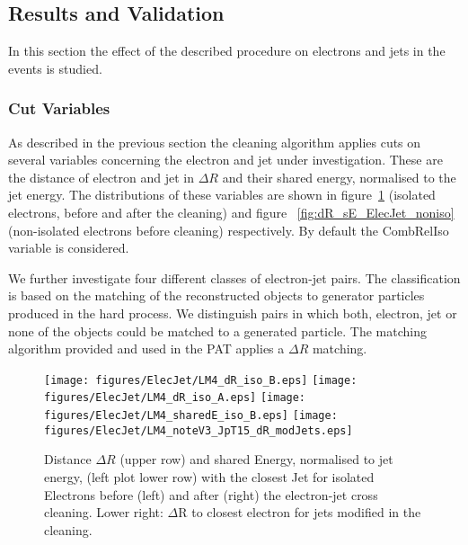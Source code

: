 \documentclass{cmspaper}
\begin{document}
\subsection{Results and Validation}
In this section the effect of the described procedure on electrons and jets in
the events is studied. 

\subsubsection{Cut Variables}
As described in the previous section the cleaning algorithm applies cuts on
several variables concerning the electron and jet under investigation. These are
the distance of electron and jet in $\Delta R$ and their shared energy,
normalised to the jet energy. The distributions of these variables are shown
in figure~\ref{fig:dR_sE_ElecJet_iso} (isolated electrons, before and after the
cleaning) and figure ~\ref{fig:dR_sE_ElecJet_noniso} (non-isolated electrons
before cleaning) respectively. By default the CombRelIso variable is considered.

We further investigate four different classes of electron-jet pairs. The
classification is based on the matching of the reconstructed objects
to generator particles produced in the hard process. We distinguish pairs in
which both, electron, jet or none of the objects could be matched to a generated
particle. The matching algorithm provided and used in the PAT applies a $\Delta
R$ matching.

\begin{figure}[hb]
\begin{center}
    \texttt{[image: figures/ElecJet/LM4\_dR\_iso\_B.eps]}
    \texttt{[image: figures/ElecJet/LM4\_dR\_iso\_A.eps]}
    \texttt{[image: figures/ElecJet/LM4\_sharedE\_iso\_B.eps]}
    \texttt{[image: figures/ElecJet/LM4\_noteV3\_JpT15\_dR\_modJets.eps]}
    \caption{Distance \(\Delta R\) (upper row) and shared Energy, normalised to jet energy, (left plot lower row) with the closest Jet for isolated Electrons before (left) and after (right) the electron-jet cross cleaning. Lower right: $\Delta$R to closest electron for jets modified in the cleaning.}
\label{fig:dR_sE_ElecJet_iso}
\end{center}
\end{figure}
\end{document}
